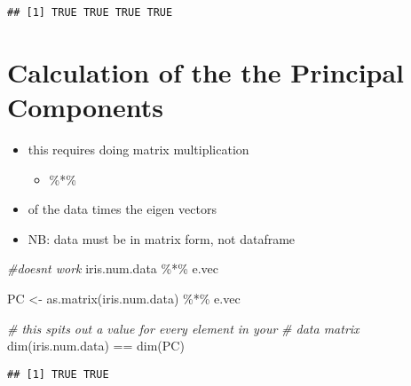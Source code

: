 \documentclass[
]{book}
\newenvironment{Shaded}{\begin{snugshade}}{\end{snugshade}}
\newcommand{\CommentTok}[1]{\textcolor[rgb]{0.56,0.35,0.01}{\textit{#1}}}
\newcommand{\FunctionTok}[1]{\textcolor[rgb]{0.00,0.00,0.00}{#1}}
\newcommand{\NormalTok}[1]{#1}
\newcommand{\OtherTok}[1]{\textcolor[rgb]{0.56,0.35,0.01}{#1}}
\newcommand{\SpecialCharTok}[1]{\textcolor[rgb]{0.00,0.00,0.00}{#1}}
\providecommand{\tightlist}{%
  \setlength{\itemsep}{0pt}\setlength{\parskip}{0pt}}
\begin{document}
\begin{verbatim}
## [1] TRUE TRUE TRUE TRUE
\end{verbatim}

\hypertarget{calculation-of-the-the-principal-components}{%
\section{Calculation of the the Principal Components}\label{calculation-of-the-the-principal-components}}

\begin{itemize}
\tightlist
\item
  this requires doing matrix multiplication

  \begin{itemize}
  \tightlist
  \item
    \%*\%
  \end{itemize}
\item
  of the data times the eigen vectors
\item
  NB: data must be in matrix form, not dataframe
\end{itemize}

\begin{Shaded}
\begin{Highlighting}[]
\CommentTok{\#doesn\textquotesingle{}t work}
\NormalTok{iris.num.data }\SpecialCharTok{\%*\%}\NormalTok{ e.vec}
\end{Highlighting}
\end{Shaded}

\begin{Shaded}
\begin{Highlighting}[]
\NormalTok{PC }\OtherTok{\textless{}{-}} \FunctionTok{as.matrix}\NormalTok{(iris.num.data) }\SpecialCharTok{\%*\%}\NormalTok{ e.vec}
\end{Highlighting}
\end{Shaded}

\begin{Shaded}
\begin{Highlighting}[]
\CommentTok{\# this spits out a value for every element in your}
\CommentTok{\# data matrix}
\FunctionTok{dim}\NormalTok{(iris.num.data) }\SpecialCharTok{==} \FunctionTok{dim}\NormalTok{(PC)}
\end{Highlighting}
\end{Shaded}

\begin{verbatim}
## [1] TRUE TRUE
\end{verbatim}
\end{document}
